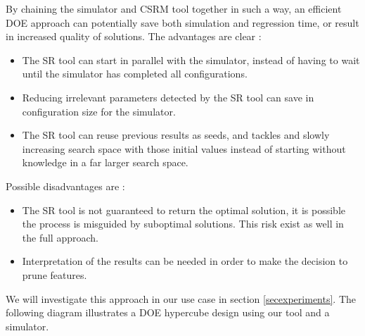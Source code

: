 By chaining the simulator and CSRM tool together in such a way, an efficient DOE approach can potentially save both simulation and regression time, or result in increased quality of solutions. 
The advantages are clear :
\begin{itemize}
\item The SR tool can start in parallel with the simulator, instead of having to wait until the simulator has completed all configurations.
\item Reducing irrelevant parameters detected by the SR tool can save in configuration size for the simulator.
\item The SR tool can reuse previous results as seeds, and tackles and slowly increasing search space with those initial values instead of starting without knowledge in a far larger search space.
\end{itemize}
Possible disadvantages are :
\begin{itemize}
\item The SR tool is not guaranteed to return the optimal solution, it is possible the process is misguided by suboptimal solutions. This risk exist as well in the full approach.
\item Interpretation of the results can be needed in order to make the decision to prune features.
\end{itemize}
We will investigate this approach in our use case in  section \ref{secexperiments}.
The following diagram illustrates a DOE hypercube design using our tool and a simulator. \\
